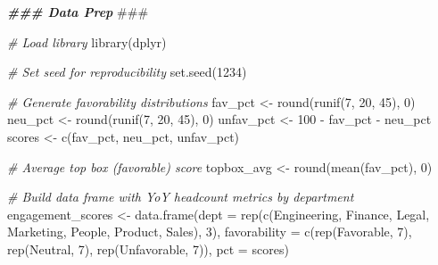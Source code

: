 \documentclass[
]{book}
\newenvironment{Shaded}{\begin{snugshade}}{\end{snugshade}}
\newcommand{\AlertTok}[1]{\textcolor[rgb]{0.94,0.16,0.16}{#1}}
\newcommand{\AttributeTok}[1]{\textcolor[rgb]{0.77,0.63,0.00}{#1}}
\newcommand{\CommentTok}[1]{\textcolor[rgb]{0.56,0.35,0.01}{\textit{#1}}}
\newcommand{\DecValTok}[1]{\textcolor[rgb]{0.00,0.00,0.81}{#1}}
\newcommand{\DocumentationTok}[1]{\textcolor[rgb]{0.56,0.35,0.01}{\textbf{\textit{#1}}}}
\newcommand{\FunctionTok}[1]{\textcolor[rgb]{0.00,0.00,0.00}{#1}}
\newcommand{\NormalTok}[1]{#1}
\newcommand{\OtherTok}[1]{\textcolor[rgb]{0.56,0.35,0.01}{#1}}
\newcommand{\SpecialCharTok}[1]{\textcolor[rgb]{0.00,0.00,0.00}{#1}}
\newcommand{\StringTok}[1]{\textcolor[rgb]{0.31,0.60,0.02}{#1}}
\begin{document}
\begin{Shaded}
\begin{Highlighting}[]
\DocumentationTok{\#\#\# Data Prep }\AlertTok{\#\#\#}

\CommentTok{\# Load library}
\FunctionTok{library}\NormalTok{(dplyr)}

\CommentTok{\# Set seed for reproducibility}
\FunctionTok{set.seed}\NormalTok{(}\DecValTok{1234}\NormalTok{)}

\CommentTok{\# Generate favorability distributions}
\NormalTok{fav\_pct }\OtherTok{\textless{}{-}} \FunctionTok{round}\NormalTok{(}\FunctionTok{runif}\NormalTok{(}\DecValTok{7}\NormalTok{, }\DecValTok{20}\NormalTok{, }\DecValTok{45}\NormalTok{), }\DecValTok{0}\NormalTok{)}
\NormalTok{neu\_pct }\OtherTok{\textless{}{-}} \FunctionTok{round}\NormalTok{(}\FunctionTok{runif}\NormalTok{(}\DecValTok{7}\NormalTok{, }\DecValTok{20}\NormalTok{, }\DecValTok{45}\NormalTok{), }\DecValTok{0}\NormalTok{)}
\NormalTok{unfav\_pct }\OtherTok{\textless{}{-}} \DecValTok{100} \SpecialCharTok{{-}}\NormalTok{ fav\_pct }\SpecialCharTok{{-}}\NormalTok{ neu\_pct}
\NormalTok{scores }\OtherTok{\textless{}{-}} \FunctionTok{c}\NormalTok{(fav\_pct, neu\_pct, unfav\_pct)}

\CommentTok{\# Average top box (favorable) score}
\NormalTok{topbox\_avg }\OtherTok{\textless{}{-}} \FunctionTok{round}\NormalTok{(}\FunctionTok{mean}\NormalTok{(fav\_pct), }\DecValTok{0}\NormalTok{)}

\CommentTok{\# Build data frame with YoY headcount metrics by department}
\NormalTok{engagement\_scores }\OtherTok{\textless{}{-}} \FunctionTok{data.frame}\NormalTok{(}\AttributeTok{dept =} \FunctionTok{rep}\NormalTok{(}\FunctionTok{c}\NormalTok{(}\StringTok{\textquotesingle{}Engineering\textquotesingle{}}\NormalTok{, }\StringTok{\textquotesingle{}Finance\textquotesingle{}}\NormalTok{, }\StringTok{\textquotesingle{}Legal\textquotesingle{}}\NormalTok{, }\StringTok{\textquotesingle{}Marketing\textquotesingle{}}\NormalTok{, }\StringTok{\textquotesingle{}People\textquotesingle{}}\NormalTok{, }\StringTok{\textquotesingle{}Product\textquotesingle{}}\NormalTok{, }\StringTok{\textquotesingle{}Sales\textquotesingle{}}\NormalTok{), }\DecValTok{3}\NormalTok{),}
                                \AttributeTok{favorability =} \FunctionTok{c}\NormalTok{(}\FunctionTok{rep}\NormalTok{(}\StringTok{\textquotesingle{}Favorable\textquotesingle{}}\NormalTok{, }\DecValTok{7}\NormalTok{), }\FunctionTok{rep}\NormalTok{(}\StringTok{\textquotesingle{}Neutral\textquotesingle{}}\NormalTok{, }\DecValTok{7}\NormalTok{), }\FunctionTok{rep}\NormalTok{(}\StringTok{\textquotesingle{}Unfavorable\textquotesingle{}}\NormalTok{, }\DecValTok{7}\NormalTok{)),}
                                \AttributeTok{pct =}\NormalTok{ scores)}


\end{Highlighting}
\end{Shaded}
\end{document}
